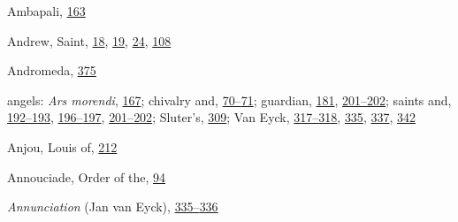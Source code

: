 Ambapali,
\protect\hyperlink{12_Chapter_Five__THE_VISION_OF_DEAT.xhtmlux5cux23page_163}{163}

Andrew, Saint,
\protect\hyperlink{08_Chapter_One__THE_PASSIONATE_INTE.xhtmlux5cux23page_18}{18},
\protect\hyperlink{08_Chapter_One__THE_PASSIONATE_INTE.xhtmlux5cux23page_19}{19},
\protect\hyperlink{08_Chapter_One__THE_PASSIONATE_INTE.xhtmlux5cux23page_24}{24},
\protect\hyperlink{10_Chapter_Three__THE_HEROIC_DREAM.xhtmlux5cux23page_108}{108}

Andromeda,
\protect\hyperlink{21_Chapter_Thirteen__IMAGE_AND_WORD.xhtmlux5cux23page_375}{375}

angels: \emph{Ars morendi},
\protect\hyperlink{12_Chapter_Five__THE_VISION_OF_DEAT.xhtmlux5cux23page_167}{167};
chivalry and,
\protect\hyperlink{10_Chapter_Three__THE_HEROIC_DREAM.xhtmlux5cux23page_70}{70--}\protect\hyperlink{10_Chapter_Three__THE_HEROIC_DREAM.xhtmlux5cux23page_71}{71};
guardian,
\protect\hyperlink{13_Chapter_Six__THE_DEPICTION_OF_TH.xhtmlux5cux23page_181}{181},
\protect\hyperlink{13_Chapter_Six__THE_DEPICTION_OF_TH.xhtmlux5cux23page_201}{201--}\protect\hyperlink{13_Chapter_Six__THE_DEPICTION_OF_TH.xhtmlux5cux23page_202}{202};
saints and,
\protect\hyperlink{13_Chapter_Six__THE_DEPICTION_OF_TH.xhtmlux5cux23page_192}{192--}\protect\hyperlink{13_Chapter_Six__THE_DEPICTION_OF_TH.xhtmlux5cux23page_193}{193},
\protect\hyperlink{13_Chapter_Six__THE_DEPICTION_OF_TH.xhtmlux5cux23page_196}{196--}\protect\hyperlink{13_Chapter_Six__THE_DEPICTION_OF_TH.xhtmlux5cux23page_197}{197},
\protect\hyperlink{13_Chapter_Six__THE_DEPICTION_OF_TH.xhtmlux5cux23page_201}{201--}\protect\hyperlink{13_Chapter_Six__THE_DEPICTION_OF_TH.xhtmlux5cux23page_202}{202};
Sluter's,
\protect\hyperlink{20_ILLUSTRATIONS_FOLLOW_PAGE.xhtmlux5cux23page_309}{309};
Van Eyck,
\protect\hyperlink{20_ILLUSTRATIONS_FOLLOW_PAGE.xhtmlux5cux23page_317}{317--}\protect\hyperlink{20_ILLUSTRATIONS_FOLLOW_PAGE.xhtmlux5cux23page_318}{318},
\protect\hyperlink{21_Chapter_Thirteen__IMAGE_AND_WORD.xhtmlux5cux23page_335}{335},
\protect\hyperlink{21_Chapter_Thirteen__IMAGE_AND_WORD.xhtmlux5cux23page_337}{337},
\protect\hyperlink{21_Chapter_Thirteen__IMAGE_AND_WORD.xhtmlux5cux23page_342}{342}

Anjou, Louis of,
\protect\hyperlink{14_Chapter_Seven__THE_PIOUS_PERSONA.xhtmlux5cux23page_212}{212}

Annouciade, Order of the,
\protect\hyperlink{10_Chapter_Three__THE_HEROIC_DREAM.xhtmlux5cux23page_94}{94}

\emph{Annunciation} (Jan van Eyck),
\protect\hyperlink{21_Chapter_Thirteen__IMAGE_AND_WORD.xhtmlux5cux23page_335}{335--}\protect\hyperlink{21_Chapter_Thirteen__IMAGE_AND_WORD.xhtmlux5cux23page_336}{336}


